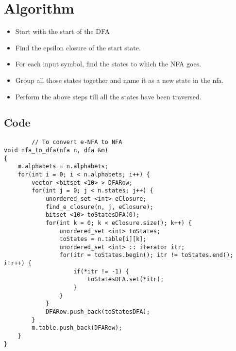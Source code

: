\documentclass[a4paper, 12pt]{report}
\begin{document}
    \section{Algorithm}
    \begin{itemize}
        \item{Start with the start of the DFA}
        \item {Find the epsilon closure of the start state.}
        \item {For each input symbol, find the states to which the NFA goes.}
        \item {Group all those states together and name it as a new state in the nfa.}
        \item {Perform the above steps till all the states have been traversed.}
    \end{itemize}

    \subsection{Code} 
    \begin{verbatim}
        // To convert e-NFA to NFA
void nfa_to_dfa(nfa n, dfa &m)
{
    m.alphabets = n.alphabets;
    for(int i = 0; i < n.alphabets; i++) {
        vector <bitset <10> > DFARow;
        for(int j = 0; j < n.states; j++) {
            unordered_set <int> eClosure;
            find_e_closure(n, j, eClosure);
            bitset <10> toStatesDFA(0);
            for(int k = 0; k < eClosure.size(); k++) {
                unordered_set <int> toStates;
                toStates = n.table[i][k];
                unordered_set <int> :: iterator itr;
                for(itr = toStates.begin(); itr != toStates.end(); itr++) {
                    if(*itr != -1) {
                        toStatesDFA.set(*itr);
                    }
                }
            }
            DFARow.push_back(toStatesDFA);
        }
        m.table.push_back(DFARow);
    }
}
    \end{verbatim}
\end{document}
